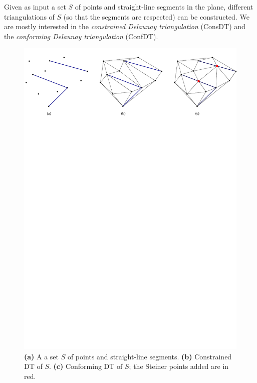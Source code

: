 Given as input a set $S$ of points and straight-line segments in the plane, different triangulations of $S$ (so that the segments are respected) can be constructed. 
We are mostly interested in the \emph{constrained Delaunay triangulation} (ConsDT) and the \emph{conforming Delaunay triangulation} (ConfDT).
\begin{figure}
  \centering
  \includegraphics[width=\linewidth]{figs/cdt_example}
  \caption{\textbf{(a)} A a set $S$ of points and straight-line segments. \textbf{(b)} Constrained DT of $S$. \textbf{(c)} Conforming DT of $S$; the Steiner points added are in red.}
\label{fig:cdt_example}
\end{figure}

%
